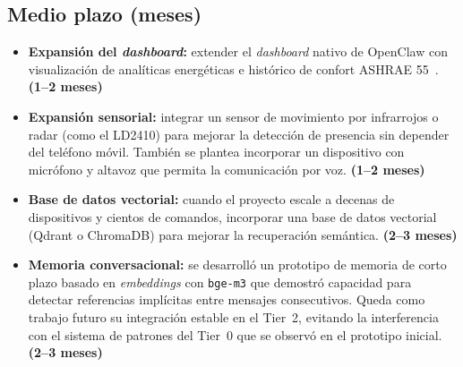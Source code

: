 \subsection*{Medio plazo (meses)}
\begin{itemize}
    \item \textbf{Expansión del \textit{dashboard}:} extender el \textit{dashboard} nativo de OpenClaw con visualización de analíticas energéticas e histórico de confort ASHRAE 55~\cite{ashrae55_2023}. \hfill \textbf{(1--2 meses)}

    \item \textbf{Expansión sensorial:} integrar un sensor de movimiento por infrarrojos o radar (como el LD2410) para mejorar la detección de presencia sin depender del teléfono móvil. También se plantea incorporar un dispositivo con micrófono y altavoz que permita la comunicación por voz. \hfill \textbf{(1--2 meses)}

    \item \textbf{Base de datos vectorial:} cuando el proyecto escale a decenas de dispositivos y cientos de comandos, incorporar una base de datos vectorial (Qdrant o ChromaDB) para mejorar la recuperación semántica. \hfill \textbf{(2--3 meses)}

    \item \textbf{Memoria conversacional:} se desarrolló un prototipo de memoria de corto plazo basado en \textit{embeddings} con \texttt{bge-m3} que demostró capacidad para detectar referencias implícitas entre mensajes consecutivos. Queda como trabajo futuro su integración estable en el Tier~2, evitando la interferencia con el sistema de patrones del Tier~0 que se observó en el prototipo inicial. \hfill \textbf{(2--3 meses)}
\end{itemize}

